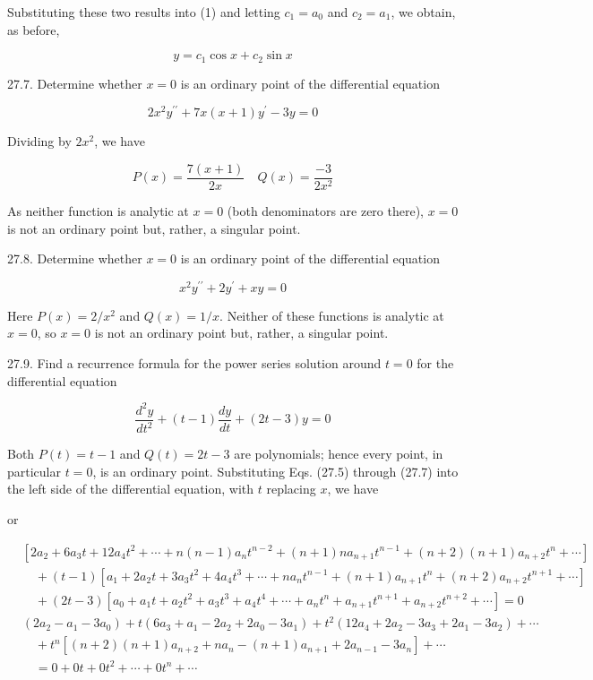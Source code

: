 \documentclass[10pt]{article}
\begin{document}
Substituting these two results into (1) and letting $c_{1}=a_{0}$ and $c_{2}=a_{1}$, we obtain, as before,

$$
y=c_{1} \cos x+c_{2} \sin x
$$

27.7. Determine whether $x=0$ is an ordinary point of the differential equation

$$
2 x^{2} y^{\prime \prime}+7 x(x+1) y^{\prime}-3 y=0
$$

Dividing by $2 x^{2}$, we have

$$
P(x)=\frac{7(x+1)}{2 x} \quad Q(x)=\frac{-3}{2 x^{2}}
$$

As neither function is analytic at $x=0$ (both denominators are zero there), $x=0$ is not an ordinary point but, rather, a singular point.

27.8. Determine whether $x=0$ is an ordinary point of the differential equation

$$
x^{2} y^{\prime \prime}+2 y^{\prime}+x y=0
$$

Here $P(x)=2 / x^{2}$ and $Q(x)=1 / x$. Neither of these functions is analytic at $x=0$, so $x=0$ is not an ordinary point but, rather, a singular point.

27.9. Find a recurrence formula for the power series solution around $t=0$ for the differential equation

$$
\frac{d^{2} y}{d t^{2}}+(t-1) \frac{d y}{d t}+(2 t-3) y=0
$$

Both $P(t)=t-1$ and $Q(t)=2 t-3$ are polynomials; hence every point, in particular $t=0$, is an ordinary point. Substituting Eqs. (27.5) through (27.7) into the left side of the differential equation, with $t$ replacing $x$, we have

or

$$
\begin{aligned}
& {\left[2 a_{2}+6 a_{3} t+12 a_{4} t^{2}+\cdots+n(n-1) a_{n} t^{n-2}+(n+1) n a_{n+1} t^{n-1}+(n+2)(n+1) a_{n+2} t^{n}+\cdots\right]} \\
& \quad+(t-1)\left[a_{1}+2 a_{2} t+3 a_{3} t^{2}+4 a_{4} t^{3}+\cdots+n a_{n} t^{n-1}+(n+1) a_{n+1} t^{n}+(n+2) a_{n+2} t^{n+1}+\cdots\right] \\
& \quad+(2 t-3)\left[a_{0}+a_{1} t+a_{2} t^{2}+a_{3} t^{3}+a_{4} t^{4}+\cdots+a_{n} t^{n}+a_{n+1} t^{n+1}+a_{n+2} t^{n+2}+\cdots\right]=0 \\
& \left(2 a_{2}-a_{1}-3 a_{0}\right)+t\left(6 a_{3}+a_{1}-2 a_{2}+2 a_{0}-3 a_{1}\right)+t^{2}\left(12 a_{4}+2 a_{2}-3 a_{3}+2 a_{1}-3 a_{2}\right)+\cdots \\
& \quad+t^{n}\left[(n+2)(n+1) a_{n+2}+n a_{n}-(n+1) a_{n+1}+2 a_{n-1}-3 a_{n}\right]+\cdots \\
& \quad=0+0 t+0 t^{2}+\cdots+0 t^{n}+\cdots
\end{aligned}
$$
\end{document}
